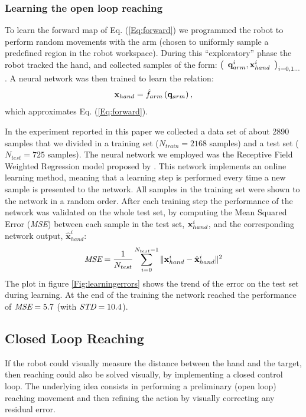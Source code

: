 \subsubsection{Learning the open loop reaching} 
\label{sec:learning-open-loop}
%
To learn the forward map of Eq. (\ref{Eq:forward}) we programmed 
the robot to perform random movements with the arm (chosen to uniformly sample 
a predefined region in the robot workspace). During this ``exploratory'' 
phase the robot tracked the hand, and collected samples of the form: $
%
\left(\begin{array}{cc}
  \qarm^i , \xhand^i\end{array}\right)_{i = 0,1\dots}$.
%
 A neural network was then trained to learn the relation:
%
\begin{equation} 
  \mathbf{x}_{hand}=\hat{f}_{arm}\left(\mathbf q_{arm} \right),
\end{equation}
%
which approximates Eq. (\ref{Eq:forward}).

In the experiment reported in this paper we collected a data set of 
about 2890 samples that we divided in a training set ($N_{train}=2168$
 samples) and 
a test set ($N_{test}=725$ samples). The neural network we employed was the 
Receptive Field Weighted Regression model proposed 
by \cite{schaal98Constructive}. This network implements an online learning
method, meaning that a learning step is performed every time a new 
sample is presented to the network. All samples in the training set were shown
to the network in a random order. After each training step the 
performance of the network was validated on the whole test set, by computing
the Mean Squared Error (\emph{MSE}) between each sample in the test set, 
$\mathbf{x}_{hand}^i$, and the corresponding network output, 
$\mathbf{\hat{x}}_{hand}^i$:
%
\begin{equation}
\emph{MSE}=\frac{1}{N_{test}}\sum_{i=0}^{N_{test}-1}\|\mathbf{x}_{hand}^i- \hat{\mathbf{x}}_{hand}^i\|^2
\end{equation}
%
The plot in figure \ref{Fig:learningerrors}
shows the trend of the error on the test set during learning. At the end of
the training the network reached the performance of $\emph{MSE}=5.7$ 
(with $\emph{STD}=10.4$).

\subsection{Closed Loop Reaching} \label{Eq:ClosedLoop}
%
If the robot could visually measure the distance
between the hand and the target, then reaching could also be solved
visually, by implementing a closed control loop. The underlying idea consists in
performing a preliminary (open loop) reaching movement and then refining the action
by visually correcting any residual error. 

